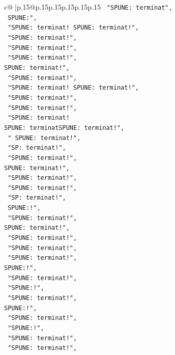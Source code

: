 \documentclass{article}
\begin{document}
{\begin{supertabular}{c@{$\;$}|p{.15\linewidth}@{}p{.15\linewidth}p{.15\linewidth}p{.15\linewidth}p{.15\linewidth}p{.15\linewidth}}
{{{\texttt{    "SPUNE: terminat",} \\
\texttt{    SPUNE:",} \\
\texttt{    "SPUNE: terminat! SPUNE: terminat!",} \\
\texttt{    "SPUNE: terminat!",} \\
\texttt{    "SPUNE: terminat!",} \\
\texttt{    "SPUNE: terminat!",} \\
\texttt{SPUNE: terminat!",} \\
\texttt{    "SPUNE: terminat!",} \\
\texttt{    "SPUNE: terminat! SPUNE: terminat!",} \\
\texttt{    "SPUNE: terminat!",} \\
\texttt{    "SPUNE: terminat!",} \\
\texttt{    "SPUNE: terminat! } \\
\texttt{SPUNE: terminatSPUNE: terminat!",} \\
\texttt{    " SPUNE: terminat!",} \\
\texttt{    "SP: terminat!",} \\
\texttt{    "SPUNE: terminat!",} \\
\texttt{SPUNE: terminat!",} \\
\texttt{    "SPUNE: terminat!",} \\
\texttt{    "SPUNE: terminat!",} \\
\texttt{    "SP: terminat!",} \\
\texttt{    SPUNE:!",} \\
\texttt{    "SPUNE: terminat!",} \\
\texttt{SPUNE: terminat!",} \\
\texttt{    "SPUNE: terminat!",} \\
\texttt{    "SPUNE: terminat!",} \\
\texttt{    "SPUNE: terminat!",} \\
\texttt{SPUNE:!",} \\
\texttt{    "SPUNE: terminat!",} \\
\texttt{    "SPUNE:!",} \\
\texttt{    "SPUNE: terminat!",} \\
\texttt{SPUNE:!",} \\
\texttt{    "SPUNE: terminat!",} \\
\texttt{    "SPUNE:!",} \\
\texttt{    "SPUNE: terminat!",} \\
\texttt{    "SPUNE: terminat!",} \\
}}}
\end{supertabular}}
\end{document}
